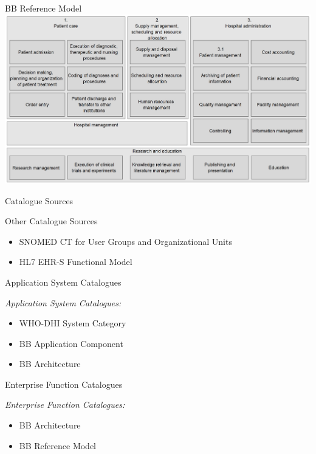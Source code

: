 \documentclass[aspectratio=1610,12pt]{beamer}
\begin{document}
\begin{frame}{BB Reference Model}
  \centering
  \includegraphics[width=\textwidth]{img/rmdl.png}
\end{frame}

\begin{frame}{Catalogue Sources}
\begin{spacing}{1.5}
  Other Catalogue Sources
  \begin{itemize}
    \item SNOMED CT for User Groups and Organizational Units
    \item HL7 EHR-S Functional Model
  \end{itemize}
\end{spacing}
\end{frame}

\begin{frame}{Application System Catalogues}
\begin{spacing}{1.25}
  \emph{Application System Catalogues:}
  \begin{itemize}
    \item WHO-DHI System Category
    \item BB Application Component
    \item BB Architecture
  \end{itemize}
\end{spacing}
\end{frame}

\begin{frame}{Enterprise Function Catalogues}
\begin{spacing}{1.25}
  \emph{Enterprise Function Catalogues:}
  \begin{itemize}
    \item BB Architecture
    \item BB Reference Model
  \end{itemize}
  \end{spacing}
\end{frame}
\end{document}
